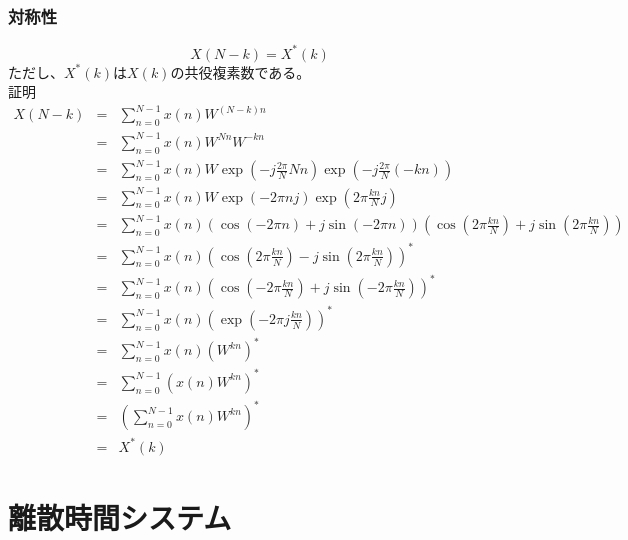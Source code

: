 \documentclass[a4paper]{jsarticle}
\begin{document}
\subsubsection{対称性}
\begin{equation}
X \left( N - k \right) = X^\ast \left( k \right)
\end{equation}
ただし、$X^\ast \left( k \right)$は$X \left( k \right)$の共役複素数である。\\
証明
\begin{eqnarray}
	X \left( N - k \right) &=& \sum _{n = 0} ^{N - 1} x \left( n \right) W ^{\left( N - k \right) n} \nonumber \\
	&=& \sum _{n = 0} ^{N - 1} x \left( n \right) W ^{Nn} W ^{-kn} \nonumber \\
	&=& \sum _{n = 0} ^{N - 1} x \left( n \right) W \exp \left(-j \frac{2 \pi}{N} Nn \right) \exp \left( -j \frac{2 \pi}{N} \left( -kn \right) \right) \nonumber \\
	&=& \sum _{n = 0} ^{N - 1} x \left( n \right) W \exp \left( -2 \pi nj \right) \exp \left( 2 \pi \frac{kn}{N} j \right) \nonumber \\
	&=& \sum _{n = 0} ^{N - 1} x \left( n \right) \left( \cos \left( -2 \pi n \right) + j \sin \left(-2 \pi n \right) \right) \left( \cos \left( 2 \pi \frac{kn}{N} \right) + j \sin \left( 2 \pi \frac{kn}{N} \right) \right) \nonumber \\
	&=& \sum _{n = 0} ^{N - 1} x \left( n \right) \left( \cos \left( 2 \pi \frac{kn}{N} \right) - j \sin \left( 2 \pi \frac{kn}{N} \right) \right) ^\ast \nonumber \\
	&=& \sum _{n = 0} ^{N - 1} x \left( n \right) \left( \cos \left( -2 \pi \frac{kn}{N} \right) + j \sin \left( -2 \pi \frac{kn}{N} \right) \right) ^\ast \nonumber \\
	&=& \sum _{n = 0} ^{N - 1} x \left( n \right) \left( \exp \left( -2 \pi j \frac{kn}{N} \right) \right) ^\ast \nonumber \\
	&=& \sum _{n = 0} ^{N - 1} x \left( n \right) \left( W ^{kn} \right) ^\ast \nonumber \\
	&=& \sum _{n = 0} ^{N - 1} \left( x \left( n \right) W ^{kn} \right) ^\ast \nonumber \\
	&=& \left( \sum _{n = 0} ^{N - 1} x \left( n \right) W ^{kn} \right) ^\ast \nonumber \\
	&=& X ^\ast \left( k \right)
\end{eqnarray}
\section{離散時間システム}
\end{document}
